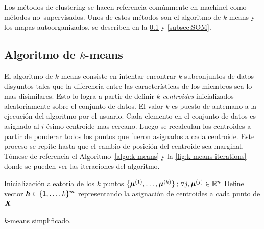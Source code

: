 Los métodos de clustering se hacen referencia comúnmente en \gls{machinel} como métodos no--supervisados. Unos de estos métodos son el algoritmo de $k$-means y los mapas autoorganizados, se describen en la \cref{ch:k-means} y \cref{subsec:SOM}.


\subsection{Algoritmo de $k$-means} \label{ch:k-means}
El algoritmo de $k$-means consiste en intentar encontrar $k$ subconjuntos de datos disyuntos tales que la diferencia entre las características de los miembros sea lo mas disimilares. Esto lo logra a partir de definir $k$ \textit{centroides} inicializados aleatoriamente sobre el conjunto de datos. El valor $k$ es puesto de antemano a la ejecución del algoritmo por el usuario. Cada elemento en el conjunto de datos es asignado al $i$-ésimo centroide mas cercano. Luego se recalculan los centroides a partir de ponderar todos los puntos que fueron asignados a cada centroide. Este proceso se repite hasta que el cambio de posición del centroide sea marginal. Tómese de referencia el Algoritmo~\ref{algo:k-means} y la \cref{fig:k-means-iterations} donde se pueden ver las iteraciones del algoritmo.

\IncMargin{1em}
\begin{algorithm}[H]
  
  Inicialización aleatoria de los $k$ puntos $\{ {\bm{\mu}}^{(1)}, \ldots, {\bm{\mu}}^{(k)} \} \,;\, \forall j, {\bm{\mu}}^{(j)} \in \mathbb{R}^{n}$\;
  Define vector ${\bm{h}} \in \{1, \ldots, k\}^{m}$ representando la asignación de centroides a cada punto de ${\bm{X}}$\;
  
  \caption{$k$-means simplificado.}
  \label{algo:k-means}
\end{algorithm}
\DecMargin{1em}

